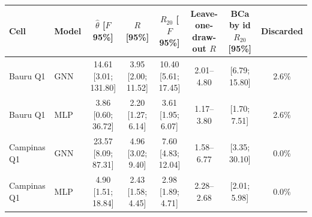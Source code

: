 \begin{tabular}{llcccccc}
\toprule
Cell & Model & $\hat\theta$ [$F$ 95\%] & $R$ [95\%] & $R_{20}$ [$F$ 95\%] & Leave-one-draw-out $R$ & BCa by id $R_{20}$ [95\%] & Discarded \\
\midrule
Bauru Q1 & GNN & 14.61 [3.01; 131.80] & 3.95 [2.00; 11.52] & 10.40 [5.61; 17.45] & 2.01--4.80 & [6.79; 15.80] & 2.6\% \\
Bauru Q1 & MLP & 3.86 [0.60; 36.72] & 2.20 [1.27; 6.14] & 3.61 [1.95; 6.07] & 1.17--3.80 & [1.70; 7.51] & 2.6\% \\
Campinas Q1 & GNN & 23.57 [8.09; 87.31] & 4.96 [3.02; 9.40] & 7.60 [4.83; 12.04] & 1.58--6.77 & [3.35; 30.10] & 0.0\% \\
Campinas Q1 & MLP & 4.90 [1.51; 18.84] & 2.43 [1.58; 4.45] & 2.98 [1.89; 4.71] & 2.28--2.68 & [2.01; 5.98] & 0.0\% \\
\bottomrule
\end{tabular}
